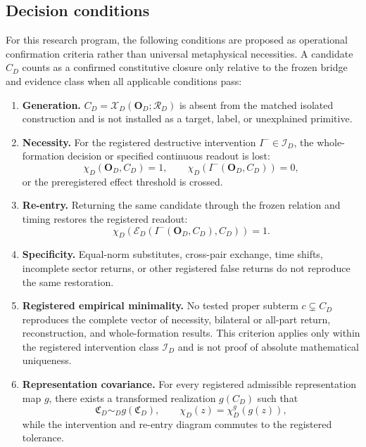 \documentclass[11pt,a4paper]{article}
\begin{document}
\subsection{Decision conditions}

For this research program, the following conditions are proposed as operational confirmation criteria rather than universal metaphysical necessities. A candidate $C_D$ counts as a confirmed constitutive closure only relative to the frozen bridge and evidence class when all applicable conditions pass:
\begin{enumerate}
  \item \textbf{Generation.} $C_D=\mathcal X_D(\mathbf O_D;\mathcal R_D)$ is absent from the matched isolated construction and is not installed as a target, label, or unexplained primitive.
  \item \textbf{Necessity.} For the registered destructive intervention $I^-\in\mathcal I_D$, the whole-formation decision or specified continuous readout is lost:
  \begin{equation}
    \chi_D(\mathbf O_D,C_D)=1,
    \qquad
    \chi_D\!\left(I^-(\mathbf O_D,C_D)\right)=0,
    \label{eq:necessity}
  \end{equation}
  or the preregistered effect threshold is crossed.
  \item \textbf{Re-entry.} Returning the same candidate through the frozen relation and timing restores the registered readout:
  \begin{equation}
    \chi_D\!\left(\mathcal E_D(I^-(\mathbf O_D,C_D),C_D)\right)=1.
    \label{eq:reentry-condition}
  \end{equation}
  \item \textbf{Specificity.} Equal-norm substitutes, cross-pair exchange, time shifts, incomplete sector returns, or other registered false returns do not reproduce the same restoration.
  \item \textbf{Registered empirical minimality.} No tested proper subterm $c\subsetneq C_D$ reproduces the complete vector of necessity, bilateral or all-part return, reconstruction, and whole-formation results. This criterion applies only within the registered intervention class $\mathcal I_D$ and is not proof of absolute mathematical uniqueness.
  \item \textbf{Representation covariance.} For every registered admissible representation map $g$, there exists a transformed realization $g(C_D)$ such that
  \begin{equation}
     \mathfrak C_D\sim_D g(\mathfrak C_D),
     \qquad
     \chi_D(z)=\chi_D^{g}(g(z)),
     \label{eq:covariance-condition}
  \end{equation}
  while the intervention and re-entry diagram commutes to the registered tolerance.
\end{enumerate}
\end{document}
